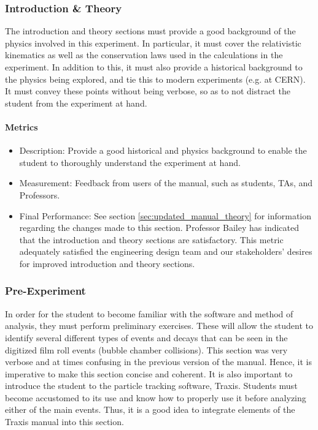 \documentclass[12pt]{article} %
\begin{document}
\subsubsection{Introduction \& Theory}
The introduction and theory sections must provide a good background of the physics involved in this experiment. In particular, it must cover the relativistic kinematics as well as the conservation laws used in the calculations in the experiment. In addition to this, it must also provide a historical background to the physics being explored, and tie this to modern experiments (e.g. at CERN). It must convey these points without being verbose, so as to not distract the student from the experiment at hand. 

\paragraph{Metrics}
\begin{itemize}
    \item Description: Provide a good historical and physics background to enable the student to thoroughly understand the experiment at hand.
    \item Measurement: Feedback from users of the manual, such as students, TAs, and Professors.
    \item Final Performance: See section \ref{sec:updated_manual_theory} for information regarding the changes made to this section. Professor Bailey has indicated that the introduction and theory sections are satisfactory. This metric adequately satisfied the engineering design team and our stakeholders’ desires for improved introduction and theory sections.
\end{itemize}

\subsubsection{Pre-Experiment}
In order for the student to become familiar with the software and method of analysis, they must perform preliminary exercises. These will allow the student to identify several different types of events and decays that can be seen in the digitized film roll events (bubble chamber collisions). This section was very verbose and at times confusing in the previous version of the manual. Hence, it is imperative to make this section concise and coherent. It is also important to introduce the student to the particle tracking software, Traxis. Students must become accustomed to its use and know how to properly use it before analyzing either of the main events. Thus, it is a good idea to integrate elements of the Traxis manual into this section.
\end{document}

